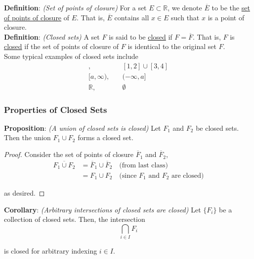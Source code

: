 \documentclass[12pt]{article}
\newcommand{\R}{\mathbb R}
\begin{document}
%
%
{\bf Definition}: {\em (Set of points of closure)} For a set $E \subset \R$, we denote $\overline{E}$ to be the \underline{set of points of closure} of $E$. That is, $\overline{E}$ contains all $x \in E$ such that $x$ is a point of closure. \\

%
%
{\bf Definition}: {\em (Closed sets)} A set $F$ is said to be \underline{closed} if $F = \overline{F}$. That is, $F$ is \underline{closed} if the set of points of closure of $F$ is identical to the original set $F$. \\

Some typical examples of closed sets include
\begin{align*}
	[a, b], &\quad [1,2] \cup [3,4] \\
	[a,\infty), &\quad (-\infty, a] \\
	\R, &\quad \emptyset
\end{align*}


\subsubsection{Properties of Closed Sets}

%
%
{\bf Proposition}: {\em (A union of closed sets is closed)} Let $F_1$ and $F_2$ be closed sets. Then the union $F_1 \cup F_2$ forms a closed set.

\begin{proof} Consider the set of points of closure $\overline{F}_1$ and $\overline{F}_2$,
\begin{align*}
	\overline{F_1 \cup F_2} &= \overline{F}_1 \cup \overline{F}_2 \quad \text{(from last class)} \\
	&= F_1 \cup F_2 \quad \text{(since $F_1$ and $F_2$ are closed)}
\end{align*}

as desired.
\end{proof}

%
%
{\bf Corollary}: {\em (Arbitrary intersections of closed sets are closed)} Let $\{F_i\}$ be a collection of closed sets. Then, the intersection
\begin{equation*}
	\bigcap_{i\in I} F_i
\end{equation*}

is closed for arbitrary indexing $i \in I$.
\end{document}
